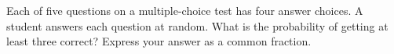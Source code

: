 Each of five questions on a multiple-choice test has four answer choices. A student answers each question at random. What is the probability of getting at least three correct? Express your answer as a common fraction.
